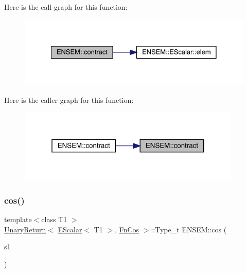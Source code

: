 Here is the call graph for this function\+:\nopagebreak
\begin{figure}[H]
\begin{center}
\leavevmode
\includegraphics[width=328pt]{d4/dca/group__escalar_ga6c04652cc005e69e9785effa182a8436_cgraph}
\end{center}
\end{figure}
Here is the caller graph for this function\+:\nopagebreak
\begin{figure}[H]
\begin{center}
\leavevmode
\includegraphics[width=301pt]{d4/dca/group__escalar_ga6c04652cc005e69e9785effa182a8436_icgraph}
\end{center}
\end{figure}
\mbox{\label{group__escalar_ga841db2f3f6d6a553733b1b75a638f052}} 
\subsubsection{\texorpdfstring{cos()}{cos()}}
{\footnotesize\ttfamily template$<$class T1 $>$ \\
\mbox{\hyperlink{structENSEM_1_1UnaryReturn}{Unary\+Return}}$<$ \mbox{\hyperlink{classENSEM_1_1EScalar}{E\+Scalar}}$<$ T1 $>$, \mbox{\hyperlink{structENSEM_1_1FnCos}{Fn\+Cos}} $>$\+::Type\+\_\+t E\+N\+S\+E\+M\+::cos (\begin{DoxyParamCaption}\item[{const \mbox{\hyperlink{classENSEM_1_1EScalar}{E\+Scalar}}$<$ T1 $>$ \&}]{s1 }\end{DoxyParamCaption})\hspace{0.3cm}{\ttfamily [inline]}}

